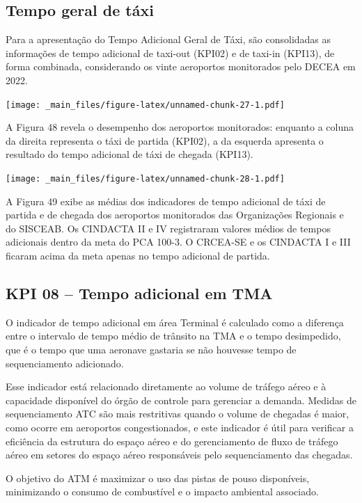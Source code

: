 \documentclass[
]{book}
\begin{document}
\hypertarget{tempo-geral-de-tuxe1xi}{%
\subsection{Tempo geral de táxi}\label{tempo-geral-de-tuxe1xi}}

Para a apresentação do Tempo Adicional Geral de Táxi, são consolidadas as informações de tempo adicional de taxi-out (KPI02) e de taxi-in (KPI13), de forma combinada, considerando os vinte aeroportos monitorados pelo DECEA em 2022.

\texttt{[image: \_main\_files/figure-latex/unnamed-chunk-27-1.pdf]}

A Figura 48 revela o desempenho dos aeroportos monitorados: enquanto a coluna da direita representa o táxi de partida (KPI02), a da esquerda apresenta o resultado do tempo adicional de táxi de chegada (KPI13).

\texttt{[image: \_main\_files/figure-latex/unnamed-chunk-28-1.pdf]}

A Figura 49 exibe as médias dos indicadores de tempo adicional de táxi de partida e de chegada dos aeroportos monitorados das Organizações Regionais e do SISCEAB. Os CINDACTA II e IV registraram valores médios de tempos adicionais dentro da meta do PCA 100-3. O CRCEA-SE e os CINDACTA I e III ficaram acima da meta apenas no tempo adicional de partida.

\hypertarget{kpi-08-tempo-adicional-em-tma}{%
\subsection{KPI 08 -- Tempo adicional em TMA}\label{kpi-08-tempo-adicional-em-tma}}

O indicador de tempo adicional em área Terminal é calculado como a diferença entre o intervalo de tempo médio de trânsito na TMA e o tempo desimpedido, que é o tempo que uma aeronave gastaria se não houvesse tempo de sequenciamento adicionado.

Esse indicador está relacionado diretamente ao volume de tráfego aéreo e à capacidade disponível do órgão de controle para gerenciar a demanda. Medidas de sequenciamento ATC são mais restritivas quando o volume de chegadas é maior, como ocorre em aeroportos congestionados, e este indicador é útil para verificar a eficiência da estrutura do espaço aéreo e do gerenciamento de fluxo de tráfego aéreo em setores do espaço aéreo responsáveis pelo sequenciamento das chegadas.

O objetivo do ATM é maximizar o uso das pistas de pouso disponíveis, minimizando o consumo de combustível e o impacto ambiental associado.
\end{document}

